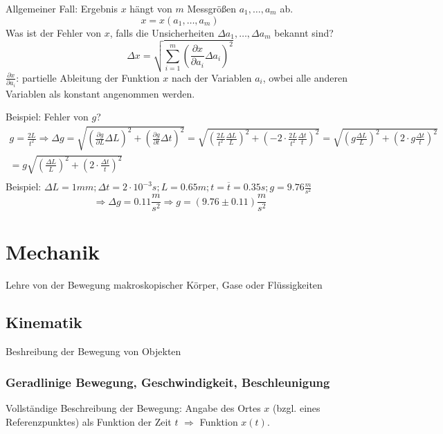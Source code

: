 \documentclass[a4paper,10pt, fleqn]{article}
\begin{document}
Allgemeiner Fall: Ergebnis $x$ hängt von $m$ Messgrößen
$a_{1},\dots, a_{m}$ ab.
$$x=x(a_{1},\dots, a_{m})$$
Was ist der Fehler von $x$, falls die Unsicherheiten
$\Delta a_{1},\dots, \Delta a_{m}$ bekannt sind?
$$ \Delta x = \sqrt{\sum_{i=1}^{m}\left( \frac{\partial x}{\partial a_{i}} \Delta a_{i} \right)^{2}}$$
$\frac{\partial x}{\partial a_{i}}$: partielle Ableitung der Funktion
$x$ nach der Variablen $a_{i}$, owbei alle anderen Variablen als konstant angenommen werden.

Beispiel: Fehler von $g$?
\begin{multline} \nonumber
  g = \frac{2 L}{t^{2}} \Rightarrow \Delta g = \sqrt{\left(
      \frac{\partial g}{\partial L} \Delta L \right)^{2} + \left(
      \frac{\partial g}{\partial t} \Delta t \right)^{2}}
  = \sqrt{\left( \frac{2L}{t^{2}} \frac{\Delta L}{L} \right)^{2} +
    \left( -2 \cdot \frac{2L}{t^{2}} \frac{\Delta t}{t}\right)^{2}} =
  \sqrt{\left( g \frac{\Delta L}{L} \right)^{2} + \left( 2 \cdot g
      \frac{\Delta t}{t}\right)^{2}} \\
  = g\sqrt{\left(\frac{\Delta L}{L} \right)^{2} + \left( 2 \cdot\frac{\Delta t}{t}\right)^{2}} \\
\end{multline}
Beispiel: $\Delta L = 1mm; \Delta t = 2\cdot 10^{-3}s; L=0.65m; t  = \overline{t} = 0.35s; g = 9.76 \frac{m}{s^{2}}$
$$\Rightarrow \Delta g = 0.11 \frac{m}{s^{2}} \Rightarrow g = (9.76 \pm 0.11)\frac{m}{s^{2}}$$

\section{Mechanik}
\label{sec:mechanik}

Lehre von der Bewegung makroskopischer Körper, Gase oder Flüssigkeiten

\subsection{Kinematik}
\label{sec:kinematik}

Beshreibung der Bewegung von Objekten

\subsubsection{Geradlinige Bewegung, Geschwindigkeit, Beschleunigung}
\label{sec:geradl-beweg-geschw}

Vollständige Beschreibung der Bewegung: Angabe des Ortes $x$ (bzgl.
eines Referenzpunktes) als Funktion der Zeit $t$ $\Rightarrow $ Funktion $x(t)$.
\end{document}
